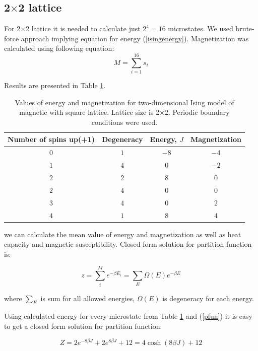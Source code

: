 \documentclass[10pt]{article}
\begin{document}
\subsection{2$\times$2 lattice}

For 2$\times$2 lattice it is needed to calculate just $2^4 = 16$ microstates. We used brute-force approach implying equation for energy (\ref{isingenergy}). Magnetization was calculated using following equation:
\[
M=\sum_{i=1}^{16} s_i
\]

Results are presented in Table \ref{tab:2x2}.

\begin{table}[h!]
  \caption{Values of energy and magnetization for two-dimensional Ising model of magnetic with square lattice. Lattice size is 2$\times$2. Periodic boundary conditions were used.}
  \label{tab:2x2}
  \begin{center}
    \begin{tabular}{c|c|c|c}
    \hline
		Number of spins up(+1) & Degeneracy & Energy, $J$ & Magnetization \\
        \hline
	$	0 $  & $ 1 $ & $ -8 $ & $ -4 $  \\
	$	1 $  & $ 4 $ & $  0 $ & $ -2 $  \\
	$	2 $  & $ 2 $ & $  8 $ & $ 0  $  \\
	$	2 $  & $ 4 $ & $  0 $ & $ 0  $  \\
	$	3 $  & $ 4 $ & $  0 $ & $ 2  $  \\
  $	4 $  & $ 1 $ & $  8 $ & $ 4  $  \\

	\end{tabular}
  \end{center}
\end{table}

 we can calculate the mean value of energy and
magnetization as well as heat capacity and magnetic susceptibility.
Closed form solution for partition function is:

\begin{equation}\label{pfun}
z=\sum_{i}^{M}e^{-\beta E_{i}}=\sum_{E}\Omega (E)e^{-\beta E}
\end{equation}

where $\sum_{E}$ is sum for all allowed energies, $\Omega (E)$ is degeneracy
for each energy. 

Using calculated energy for every microstate from Table \ref{tab:2x2} and (\ref{pfun}) it is easy to get a closed form solution for
partition function:

\begin{equation}
Z=2e^{-8\beta J}+2e^{8\beta J}+12=4\cosh (8\beta J)+12
\end{equation}
\end{document}
